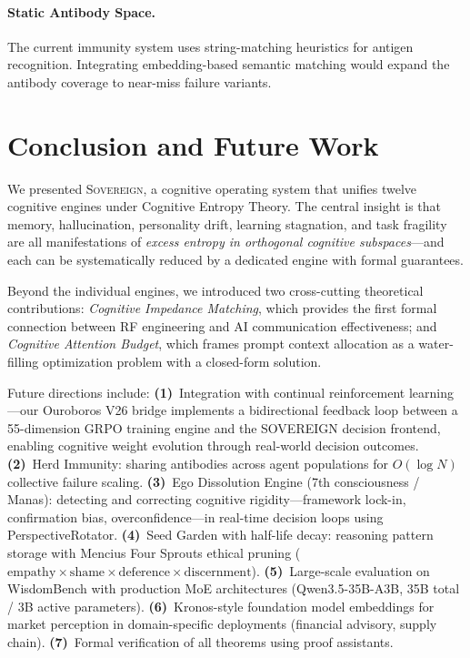\documentclass[11pt,a4paper]{article}
\begin{document}
\paragraph{Static Antibody Space.}
The current immunity system uses string-matching heuristics for antigen
recognition. Integrating embedding-based semantic matching would expand
the antibody coverage to near-miss failure variants.


\section{Conclusion and Future Work}

We presented \textsc{Sovereign}, a cognitive operating system that unifies
twelve cognitive engines under Cognitive Entropy Theory. The central insight
is that memory, hallucination, personality drift, learning stagnation, and
task fragility are all manifestations of \emph{excess entropy in orthogonal
cognitive subspaces}---and each can be systematically reduced by a dedicated
engine with formal guarantees.

Beyond the individual engines, we introduced two cross-cutting theoretical
contributions: \emph{Cognitive Impedance Matching}, which provides the first
formal connection between RF engineering and AI communication effectiveness;
and \emph{Cognitive Attention Budget}, which frames prompt context allocation
as a water-filling optimization problem with a closed-form solution.

Future directions include:
\textbf{(1)}~Integration with continual reinforcement learning---our
Ouroboros V26 bridge implements a bidirectional feedback loop between a
55-dimension GRPO training engine and the SOVEREIGN decision frontend,
enabling cognitive weight evolution through real-world decision outcomes.
\textbf{(2)}~Herd Immunity: sharing antibodies across agent populations for
$O(\log N)$ collective failure scaling.
\textbf{(3)}~Ego Dissolution Engine (7th consciousness / Manas): detecting
and correcting cognitive rigidity---framework lock-in, confirmation bias,
overconfidence---in real-time decision loops using PerspectiveRotator.
\textbf{(4)}~Seed Garden with half-life decay: reasoning pattern storage
with Mencius Four Sprouts ethical pruning ($\text{empathy} \times
\text{shame} \times \text{deference} \times \text{discernment}$).
\textbf{(5)}~Large-scale evaluation on WisdomBench with production MoE
architectures (Qwen3.5-35B-A3B, 35B total / 3B active parameters).
\textbf{(6)}~Kronos-style foundation model embeddings for market perception
in domain-specific deployments (financial advisory, supply chain).
\textbf{(7)}~Formal verification of all theorems using proof assistants.
\end{document}
